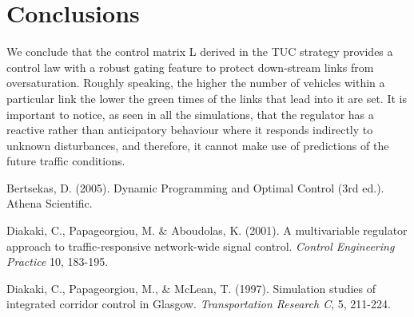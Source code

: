 \documentclass[11pt]{article}
\begin{document}
\section{Conclusions}

We conclude that the control matrix L derived in the TUC strategy provides a control law with a robust gating feature to protect down-stream links from oversaturation. Roughly speaking, the higher the number of vehicles within a particular link the lower the green times of the links that lead into it are set. It is important to notice, as seen in all the simulations, that the regulator has a reactive rather than anticipatory behaviour where it responds indirectly to unknown disturbances, and therefore, it cannot make use of predictions of the future traffic conditions. 
 \clearpage

\begin{thebibliography}{9}
Bertsekas, D. (2005). Dynamic Programming and Optimal Control (3rd ed.). Athena Scientific.

Diakaki, C., Papageorgiou, M. \& Aboudolas, K. (2001).
A multivariable regulator approach to traffic-responsive network-wide signal control.
\textit{Control Engineering Practice} 10, 183-195.

Diakaki, C., Papageorgiou, M., \& McLean, T. (1997). Simulation studies of integrated corridor control in Glasgow. 
\textit{Transportation Research C}, 5, 211-224.

\end{thebibliography}

\end{document}
